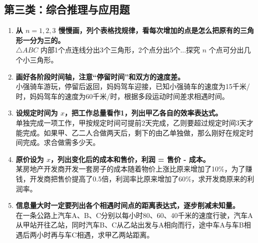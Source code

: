 \documentclass{ctexart}
\begin{document}
\subsection*{第三类：综合推理与应用题}
\begin{enumerate}
    \item \textbf{从 $n=1,2,3$ 慢慢画，列个表格找规律，看每次增加的点是怎么把原有的三角形一分为三的。} \\
    $\triangle ABC$ 内部1个点连线分出3个三角形，2个点分出5个...探究 $n$ 个点可分出几个小三角形。
    \vspace{2cm}
    \vspace{2cm}
    \item \textbf{画好各阶段时间轴，注意“停留时间”和双方的速度差。} \\
    小强骑车游玩，停留后返回，妈妈驾车迎接，已知小强骑车的速度为15千米/时，妈妈驾车的速度为60千米/时，根据多段运动时间差求相遇时间。
    \vspace{2cm}
    \vspace{2cm}
    \item \textbf{设规定时间为 $x$，把工作总量看作1，列出甲乙各自的效率表达式。} \\
    单独完成一项工作，甲按规定时间可提前2天完成，乙则要超过规定时间3天才能完成。如果甲、乙二人合做两天后，剩下的由乙单独做，那么刚好在规定时间完成。求合做需多少天。
    \vspace{2cm}
    \vspace{2cm}
    \item \textbf{原价设为 $x$，列出变化后的成本和售价，利润 = 售价 - 成本。} \\
    某房地产开发商开发一套房子的成本随着物价上涨比原来增加了10\%，为了赚钱，开发商把售价提高了0.5倍，利润率比原来增加了60\%，求开发商原来的利润率。
    \vspace{2cm}
    \vspace{2cm}
    \item \textbf{信息量大时一定要列出各个相遇时间点的距离表达式，逐步削减未知量。} \\
    在一条公路上汽车A、B、C分别以每小时80、60、40千米的速度行驶，汽车A从甲站开往乙站，同时汽车B、C从乙站出发与A相向而行，途中车A与车B相遇后两小时再与车C相遇，求甲乙两站距离。
    \vspace{2cm}
    \vspace{2cm}
\end{enumerate}
\end{document}
